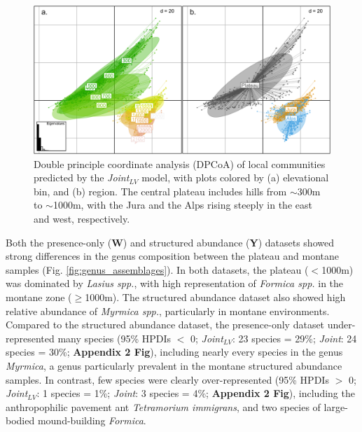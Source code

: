 \documentclass[preprint,review,times,12pt]{elsarticle}
\begin{document}
\begin{figure}
	\centering\includegraphics[width=5in]{ms/1_Ecography/1/figs/DPCoA_J_LV.png}
	\caption{\label{fig:dpcoa} Double principle coordinate analysis (DPCoA) of local communities predicted by the \emph{Joint}$_{LV}$ model, with plots colored by (a) elevational bin, and (b) region. The central plateau includes hills from $\sim$300m to $\sim$1000m, with the Jura and the Alps rising steeply in the east and west, respectively. }
\end{figure}

Both the presence-only (\textbf{W}) and structured abundance (\textbf{Y}) datasets showed strong differences in the genus composition between the plateau and montane samples (Fig. \ref{fig:genus_assemblages}). In both datasets, the plateau ($<$1000m) was dominated by \emph{Lasius spp.}, with high representation of \emph{Formica spp.} in the montane zone ($\geq$1000m). The structured abundance dataset also showed high relative abundance of \emph{Myrmica spp.}, particularly in montane environments. Compared to the structured abundance dataset, the presence-only dataset under-represented many species (95\% HPDIs $<$ 0; \emph{Joint}$_{LV}$: 23 species = 29\%; \emph{Joint}: 24 species = 30\%; \textbf{Appendix 2 Fig}), including nearly every species in the genus \emph{Myrmica}, a genus particularly prevalent in the montane structured abundance samples. In contrast, few species were clearly over-represented (95\% HPDIs $>$ 0; \emph{Joint}$_{LV}$: 1 species = 1\%; \emph{Joint}: 3 species = 4\%; \textbf{Appendix 2 Fig}), including the anthropophilic pavement ant \emph{Tetramorium immigrans}, and two species of large-bodied mound-building \emph{Formica}. 
\end{document}
